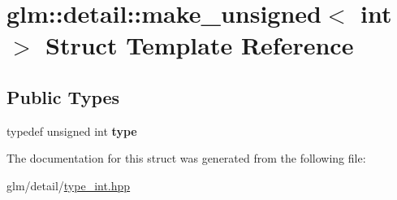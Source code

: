 \hypertarget{structglm_1_1detail_1_1make__unsigned_3_01int_01_4}{\section{glm\-:\-:detail\-:\-:make\-\_\-unsigned$<$ int $>$ Struct Template Reference}
\label{structglm_1_1detail_1_1make__unsigned_3_01int_01_4}
}
\subsection*{Public Types}
\begin{DoxyCompactItemize}
\item 
\hypertarget{structglm_1_1detail_1_1make__unsigned_3_01int_01_4_ac3fd57ed35c0305bbe941009a84139c1}{typedef unsigned int {\bfseries type}}\label{structglm_1_1detail_1_1make__unsigned_3_01int_01_4_ac3fd57ed35c0305bbe941009a84139c1}

\end{DoxyCompactItemize}


The documentation for this struct was generated from the following file\-:\begin{DoxyCompactItemize}
\item 
glm/detail/\hyperlink{type__int_8hpp}{type\-\_\-int.\-hpp}\end{DoxyCompactItemize}
